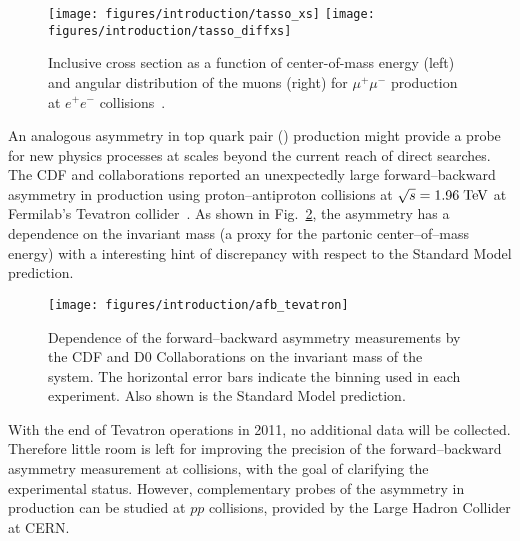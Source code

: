 \begin{figure}[!htb]\centering
  \texttt{[image: figures/introduction/tasso\_xs]}
  \texttt{[image: figures/introduction/tasso\_diffxs]}
  \caption{Inclusive cross section as a function of center-of-mass
    energy (left) and angular distribution of the muons (right) for
    $\mu^+\mu^-$ production at $e^+e^-$ collisions~\cite{Braunschweig:1988fy}.}
  \label{fig:tasso}
\end{figure}

An analogous asymmetry in top quark pair (\ttbar{}) production might provide a
probe for new physics processes at scales beyond the current reach of direct
searches. The CDF and \dzero{} collaborations reported an unexpectedly
large forward--backward asymmetry in \ttbar{} production using
proton--antiproton collisions at $\sqrt{s}=1.96\; \mathrm{TeV}{}$ at Fermilab's
Tevatron collider~\cite{Abazov:2014cca,Aaltonen:2012it}. As shown in
Fig.~\ref{fig:afbtev}, the asymmetry has a dependence on the \ttbar{}
invariant mass (a proxy for the partonic center--of--mass energy) with
a interesting hint of discrepancy with respect to the Standard Model
prediction.
\begin{figure}[!htb]\centering
  \texttt{[image: figures/introduction/afb\_tevatron]}
  \caption{Dependence of the forward--backward asymmetry measurements
    by the CDF and D0 Collaborations on the invariant mass of the
    \ttbar{} system. The horizontal error bars indicate the binning
    used in each experiment. Also shown is the Standard Model
    prediction.}
  \label{fig:afbtev}
\end{figure}
With the end of Tevatron operations in 2011, no additional data will
be collected. Therefore little room is left for improving the
precision of the forward--backward asymmetry measurement at \ppbar{}
collisions, with the goal of clarifying the experimental status.
However, complementary probes of the asymmetry in \ttbar{} production
can be studied at $pp$ collisions, provided by the Large Hadron
Collider at CERN.

